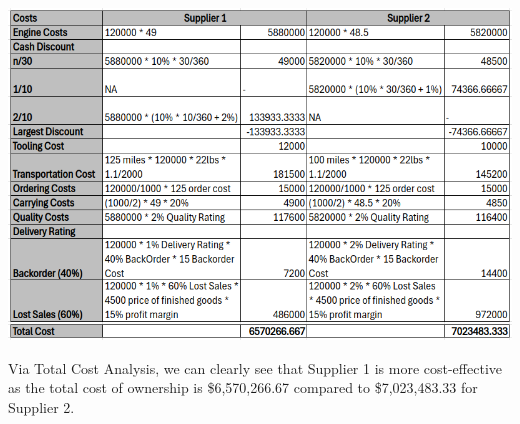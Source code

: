 \documentclass[addpoints]{exam}
\begin{document}
\begin{sloppypar}
\begin{questions}
\begin{solution}
        \begin{center}
            \includegraphics[width=\textwidth]{tca_1.png}
        \end{center}
        Via Total Cost Analysis, we can clearly see that Supplier 1 is more cost-effective as the total cost of ownership is \$6,570,266.67 compared to \$7,023,483.33 for Supplier 2.
    \end{solution}


\end{questions}
\end{sloppypar}
\end{document}
